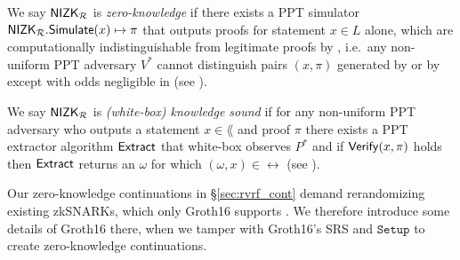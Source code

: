 \def\advV{\ensuremath{V^*}\xspace} %

\begin{definition}\label{def:nizk_zero_knowledge}
	We say ${\mathsf{NIZK}}_\mathcal{R}$ is {\em zero-knowledge} if
	there exists a PPT simulator ${\mathsf{NIZK}}_\mathcal{R}.{\mathsf{Simulate}}(x) \mapsto \pi$
	that outputs proofs for statement $x \in L$ alone, which are
	computationally indistinguishable from legitimate proofs by \Prove,
	i.e.\ any non-uniform PPT adversary \advV cannot distinguish pairs $(x,\pi)$
	generated by \Simulate or by \Prove except with odds negligible in \secparam
	(see \cite[Def. 9, \S A, pap. 29]{RandomizationGroth16}). %
\end{definition}

\def\advP{\ensuremath{P^*}\xspace} %

\begin{definition}\label{def:nizk_knowledge_sound}
	We say ${\mathsf{NIZK}}_\mathcal{R}$ is {\em (white-box) knowledge sound} if
	for any non-uniform PPT adversary \adv who outputs a statement $x \in \lang$ and proof $\pi$
	there exists a PPT extractor algorithm ${\mathsf{Extract}}$ that white-box observes $\advP$ and
	if ${\mathsf{Verify}}(x,\pi)$ holds then ${\mathsf{Extract}}$ returns an $\omega$ for which $(\omega,x) \in \rel$
	(see \cite[Def. 7, \S A, pap. 29]{RandomizationGroth16}).
\end{definition}

Our zero-knowledge continuations in \S\ref{sec:rvrf_cont} demand
rerandomizing existing zkSNARKs, which only Groth16 supports \cite{Groth16}.
We therefore introduce some details of Groth16 \cite{Groth16} there,
when we tamper with Groth16's SRS and $\mathtt{Setup}$ to create zero-knowledge continuations. 

%


